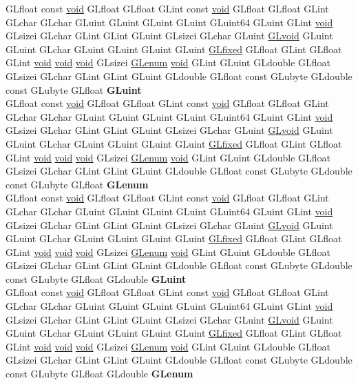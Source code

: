\begin{DoxyCompactItemize}
\begin{tabbing}
\>GLfloat const \hyperlink{interfacevoid}{void} GLfloat GLfloat GLint const \hyperlink{interfacevoid}{void} GLfloat GLfloat GLint GLchar GLchar GLuint GLuint GLuint GLuint GLuint64 GLuint GLint \hyperlink{interfacevoid}{void} GLsizei GLchar GLint GLint GLuint GLsizei GLchar GLuint \hyperlink{interfacevoid}{GLvoid} GLuint GLuint GLchar GLuint GLuint GLuint GLuint \hyperlink{glheader_8h_ad6d3fa892df40dedf48ee6d84529ae5e}{GLfixed} GLfloat GLint GLfloat GLint \hyperlink{interfacevoid}{void} \hyperlink{interfacevoid}{void} \hyperlink{interfacevoid}{void} GLsizei \hyperlink{interfacevoid}{GLenum} \hyperlink{interfacevoid}{void} GLint GLuint GLdouble GLfloat GLsizei GLchar GLint GLint GLuint GLdouble GLfloat const GLubyte GLdouble const GLubyte GLfloat {\bfseries GLuint}\\
\>GLfloat const \hyperlink{interfacevoid}{void} GLfloat GLfloat GLint const \hyperlink{interfacevoid}{void} GLfloat GLfloat GLint GLchar GLchar GLuint GLuint GLuint GLuint GLuint64 GLuint GLint \hyperlink{interfacevoid}{void} GLsizei GLchar GLint GLint GLuint GLsizei GLchar GLuint \hyperlink{interfacevoid}{GLvoid} GLuint GLuint GLchar GLuint GLuint GLuint GLuint \hyperlink{glheader_8h_ad6d3fa892df40dedf48ee6d84529ae5e}{GLfixed} GLfloat GLint GLfloat GLint \hyperlink{interfacevoid}{void} \hyperlink{interfacevoid}{void} \hyperlink{interfacevoid}{void} GLsizei \hyperlink{interfacevoid}{GLenum} \hyperlink{interfacevoid}{void} GLint GLuint GLdouble GLfloat GLsizei GLchar GLint GLint GLuint GLdouble GLfloat const GLubyte GLdouble const GLubyte GLfloat {\bfseries GLenum}\\
\>GLfloat const \hyperlink{interfacevoid}{void} GLfloat GLfloat GLint const \hyperlink{interfacevoid}{void} GLfloat GLfloat GLint GLchar GLchar GLuint GLuint GLuint GLuint GLuint64 GLuint GLint \hyperlink{interfacevoid}{void} GLsizei GLchar GLint GLint GLuint GLsizei GLchar GLuint \hyperlink{interfacevoid}{GLvoid} GLuint GLuint GLchar GLuint GLuint GLuint GLuint \hyperlink{glheader_8h_ad6d3fa892df40dedf48ee6d84529ae5e}{GLfixed} GLfloat GLint GLfloat GLint \hyperlink{interfacevoid}{void} \hyperlink{interfacevoid}{void} \hyperlink{interfacevoid}{void} GLsizei \hyperlink{interfacevoid}{GLenum} \hyperlink{interfacevoid}{void} GLint GLuint GLdouble GLfloat GLsizei GLchar GLint GLint GLuint GLdouble GLfloat const GLubyte GLdouble const GLubyte GLfloat GLdouble {\bfseries GLuint}\\
\>GLfloat const \hyperlink{interfacevoid}{void} GLfloat GLfloat GLint const \hyperlink{interfacevoid}{void} GLfloat GLfloat GLint GLchar GLchar GLuint GLuint GLuint GLuint GLuint64 GLuint GLint \hyperlink{interfacevoid}{void} GLsizei GLchar GLint GLint GLuint GLsizei GLchar GLuint \hyperlink{interfacevoid}{GLvoid} GLuint GLuint GLchar GLuint GLuint GLuint GLuint \hyperlink{glheader_8h_ad6d3fa892df40dedf48ee6d84529ae5e}{GLfixed} GLfloat GLint GLfloat GLint \hyperlink{interfacevoid}{void} \hyperlink{interfacevoid}{void} \hyperlink{interfacevoid}{void} GLsizei \hyperlink{interfacevoid}{GLenum} \hyperlink{interfacevoid}{void} GLint GLuint GLdouble GLfloat GLsizei GLchar GLint GLint GLuint GLdouble GLfloat const GLubyte GLdouble const GLubyte GLfloat GLdouble {\bfseries GLenum}\\

\end{tabbing}
\end{DoxyCompactItemize}
